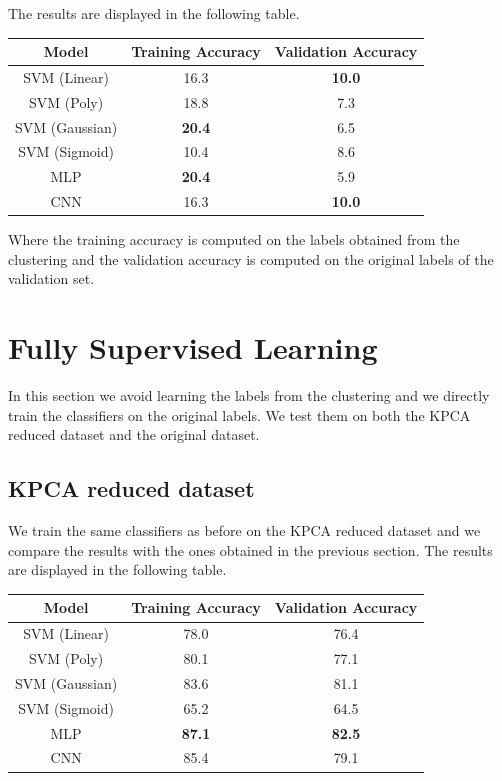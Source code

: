 The results are displayed in the following table.
\begin{table}[H]
    \centering
    \begin{tabular}{|c|c|c|}
        \hline
        Model          & Training Accuracy & Validation Accuracy \\
        \hline
        SVM (Linear)   & 16.3 & \textbf{10.0} \\
        SVM (Poly)     & 18.8 & 7.3 \\
        SVM (Gaussian) & \textbf{20.4} & 6.5 \\
        SVM (Sigmoid)  & 10.4 & 8.6 \\
        MLP            & \textbf{20.4} & 5.9 \\
        CNN            & 16.3 & \textbf{10.0} \\
        \hline
    \end{tabular}
\end{table}
Where the training accuracy is computed on the labels obtained from the
clustering and the validation accuracy is computed on the original labels of 
the validation set.


\section{Fully Supervised Learning}

In this section we avoid learning the labels from the clustering and we
directly train the classifiers on the original labels. We test them on
both the KPCA reduced dataset and the original dataset.

\subsection{KPCA reduced dataset}
We train the same classifiers as before on the KPCA reduced dataset and
we compare the results with the ones obtained in the previous section.
The results are displayed in the following table.
\begin{table}[H]
    \centering
    \begin{tabular}{|c|c|c|}
        \hline
        Model          & Training Accuracy & Validation Accuracy \\
        \hline
        SVM (Linear)   & 78.0 & 76.4 \\
        SVM (Poly)     & 80.1 & 77.1 \\
        SVM (Gaussian) & 83.6 & 81.1 \\
        SVM (Sigmoid)  & 65.2 & 64.5 \\
        MLP            & \textbf{87.1} & \textbf{82.5} \\
        CNN            & 85.4 & 79.1 \\
        \hline
    \end{tabular}
\end{table}

